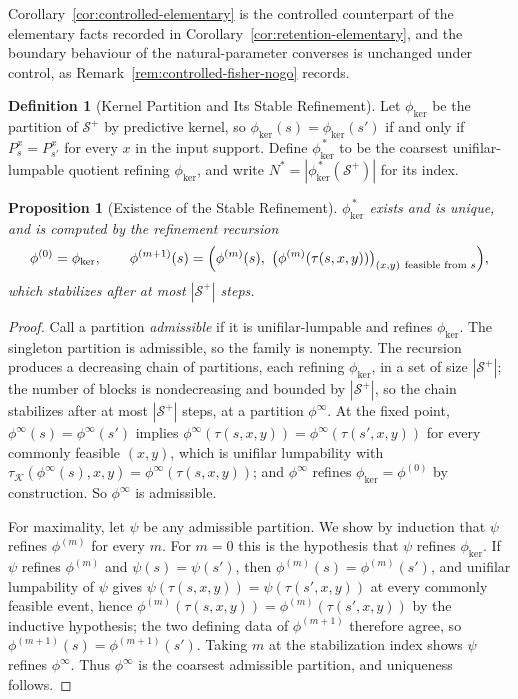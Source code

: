\documentclass[12pt]{article}
\newtheorem{proposition}[theorem]{Proposition}
\theoremstyle{definition}
\newtheorem{definition}[theorem]{Definition}
\newcommand{\Splus}{\mathcal S^{+}}
\begin{document}
Corollary~\ref{cor:controlled-elementary} is the controlled counterpart of the
elementary facts recorded in Corollary~\ref{cor:retention-elementary}, and the
boundary behaviour of the natural-parameter converses is unchanged under
control, as Remark~\ref{rem:controlled-fisher-nogo} records.

\begin{definition}[Kernel Partition and Its Stable Refinement]
\label{def:kernel-refinement}
Let $\phi_{\ker}$ be the partition of $\Splus$ by predictive kernel, so
$\phi_{\ker}(s)=\phi_{\ker}(s')$ if and only if $P_s^x=P_{s'}^x$ for every $x$
in the input support.  Define $\phi_{\ker}^{\,\ast}$ to be the coarsest
unifilar-lumpable quotient refining $\phi_{\ker}$, and write
$N^{\ast}=|\phi_{\ker}^{\,\ast}(\Splus)|$ for its index.
\end{definition}

\begin{proposition}[Existence of the Stable Refinement]
\label{prop:kernel-refinement-exists}
$\phi_{\ker}^{\,\ast}$ exists and is unique, and is computed by the refinement
recursion
\[
\phi^{(0)}=\phi_{\ker},
\qquad
\phi^{(m+1)}(s)
=
\Bigl(\phi^{(m)}(s),\ \bigl(\phi^{(m)}(\tau(s,x,y))\bigr)_{(x,y)\ \text{feasible from }s}\Bigr),
\]
which stabilizes after at most $|\Splus|$ steps.
\end{proposition}

\begin{proof}
Call a partition \emph{admissible} if it is unifilar-lumpable and refines
$\phi_{\ker}$.  The singleton partition is admissible, so the family is
nonempty.  The recursion produces a decreasing chain of partitions, each
refining $\phi_{\ker}$, in a set of size $|\Splus|$; the number of blocks is
nondecreasing and bounded by $|\Splus|$, so the chain stabilizes after at most
$|\Splus|$ steps, at a partition $\phi^{\infty}$.  At the fixed point,
$\phi^{\infty}(s)=\phi^{\infty}(s')$ implies
$\phi^{\infty}(\tau(s,x,y))=\phi^{\infty}(\tau(s',x,y))$ for every commonly
feasible $(x,y)$, which is unifilar lumpability with
$\tau_{\mathcal K}(\phi^{\infty}(s),x,y)=\phi^{\infty}(\tau(s,x,y))$; and
$\phi^{\infty}$ refines $\phi_{\ker}=\phi^{(0)}$ by construction.  So
$\phi^{\infty}$ is admissible.

For maximality, let $\psi$ be any admissible partition.  We show by induction
that $\psi$ refines $\phi^{(m)}$ for every $m$.  For $m=0$ this is the
hypothesis that $\psi$ refines $\phi_{\ker}$.  If $\psi$ refines $\phi^{(m)}$
and $\psi(s)=\psi(s')$, then $\phi^{(m)}(s)=\phi^{(m)}(s')$, and unifilar
lumpability of $\psi$ gives $\psi(\tau(s,x,y))=\psi(\tau(s',x,y))$ at every
commonly feasible event, hence
$\phi^{(m)}(\tau(s,x,y))=\phi^{(m)}(\tau(s',x,y))$ by the inductive
hypothesis; the two defining data of $\phi^{(m+1)}$ therefore agree, so
$\phi^{(m+1)}(s)=\phi^{(m+1)}(s')$.  Taking $m$ at the stabilization index
shows $\psi$ refines $\phi^{\infty}$.  Thus $\phi^{\infty}$ is the coarsest
admissible partition, and uniqueness follows.
\end{proof}
\end{document}
